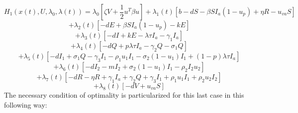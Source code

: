 \documentclass[a4paper]{article}
\begin{document}
\begin{equation*}
H_1\left(x\left(t\right),U,\lambda _0,\lambda \left(t\right)\right)=\lambda _0\left[\mathit{\zeta V}+\frac 1
2u^T\mathit{\beta u}\right]+\lambda _1\left(t\right)\left[b-\mathit{dS}-\mathit{\beta
S}I_a\left(1-u_p\right)+\mathit{\eta R}-u_{\mathit{va}}S\right]
\end{equation*}
\begin{equation*}
+\lambda _2\left(t\right)\left[-\mathit{dE}+\mathit{\beta S}I_a\left(1-u_p\right)-\mathit{kE}\right]
\end{equation*}
\begin{equation*}
+\lambda _3\left(t\right)\left[-\mathit{dI}+\mathit{kE}-\mathit{\lambda \tau }I_a-\gamma _1I_a\right]
\end{equation*}
\begin{equation*}
+\lambda _4\left(t\right)\left[-\mathit{dQ}+\mathit{p\lambda \tau }I_a-\gamma _2Q-\sigma _1Q\right]
\end{equation*}
\begin{equation*}
+\lambda _5\left(t\right)\left[-dI_1+\sigma _1Q-\gamma _3I_1-\rho _1u_1I_1-\sigma
_2\left(1-u_1\right)I_1+\left(1-p\right)\mathit{\lambda \tau }I_a\right]
\end{equation*}
\begin{equation*}
+\lambda _6\left(t\right)\left[-dI_2-mI_2+\sigma _2\left(1-u_1\right)I_1-\rho _2I_2u_2\right]
\end{equation*}
\begin{equation*}
+\lambda _7\left(t\right)\left[-\mathit{dR}-\mathit{\eta R}+\gamma _1I_a+\gamma _2Q+\gamma _3I_1+\rho _1u_1I_1+\rho
_2u_2I_2\right]
\end{equation*}
\begin{equation*}
+\lambda _8\left(t\right)\left[-\mathit{dV}+u_{\mathit{va}}S\right]
\end{equation*}
The necessary condition of optimality is particularized for this last case in this following way:
\end{document}
